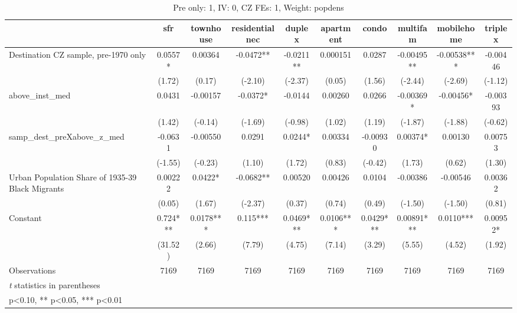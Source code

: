 \begin{table}[htbp]\centering
\def\sym#1{\ifmmode^{#1}\else\(^{#1}\)\fi}
\caption{Pre only: 1, IV: 0, CZ FEs: 1, Weight: popdens}
\begin{tabular}{l*{9}{c}}
\toprule
                    &\multicolumn{1}{c}{sfr}&\multicolumn{1}{c}{townhouse}&\multicolumn{1}{c}{residentialnec}&\multicolumn{1}{c}{duplex}&\multicolumn{1}{c}{apartment}&\multicolumn{1}{c}{condo}&\multicolumn{1}{c}{multifam}&\multicolumn{1}{c}{mobilehome}&\multicolumn{1}{c}{triplex}\\
\midrule
Destination CZ sample, pre-1970 only&      0.0557*  &     0.00364   &     -0.0472** &     -0.0211** &    0.000151   &      0.0287   &    -0.00495** &    -0.00538***&    -0.00446   \\
                    &      (1.72)   &      (0.17)   &     (-2.10)   &     (-2.37)   &      (0.05)   &      (1.56)   &     (-2.44)   &     (-2.69)   &     (-1.12)   \\
\addlinespace
above\_inst\_med      &      0.0431   &    -0.00157   &     -0.0372*  &     -0.0144   &     0.00260   &      0.0266   &    -0.00369*  &    -0.00456*  &    -0.00393   \\
                    &      (1.42)   &     (-0.14)   &     (-1.69)   &     (-0.98)   &      (1.02)   &      (1.19)   &     (-1.87)   &     (-1.88)   &     (-0.62)   \\
\addlinespace
samp\_dest\_preXabove\_z\_med&     -0.0631   &    -0.00550   &      0.0291   &      0.0244*  &     0.00334   &    -0.00930   &     0.00374*  &     0.00130   &     0.00753   \\
                    &     (-1.55)   &     (-0.23)   &      (1.10)   &      (1.72)   &      (0.83)   &     (-0.42)   &      (1.73)   &      (0.62)   &      (1.30)   \\
\addlinespace
Urban Population Share of 1935-39 Black Migrants&     0.00222   &      0.0422*  &     -0.0682** &     0.00520   &     0.00426   &      0.0104   &    -0.00386   &    -0.00546   &     0.00362   \\
                    &      (0.05)   &      (1.67)   &     (-2.37)   &      (0.37)   &      (0.74)   &      (0.49)   &     (-1.50)   &     (-1.50)   &      (0.81)   \\
\addlinespace
Constant            &       0.724***&      0.0178***&       0.115***&      0.0469***&      0.0106***&      0.0429***&     0.00891***&      0.0110***&     0.00952*  \\
                    &     (31.52)   &      (2.66)   &      (7.79)   &      (4.75)   &      (7.14)   &      (3.29)   &      (5.55)   &      (4.52)   &      (1.92)   \\
\midrule
Observations        &        7169   &        7169   &        7169   &        7169   &        7169   &        7169   &        7169   &        7169   &        7169   \\
\bottomrule
\multicolumn{10}{l}{\footnotesize \textit{t} statistics in parentheses}\\
\multicolumn{10}{l}{\footnotesize * p<0.10, ** p<0.05, *** p<0.01}\\
\end{tabular}
\end{table}
